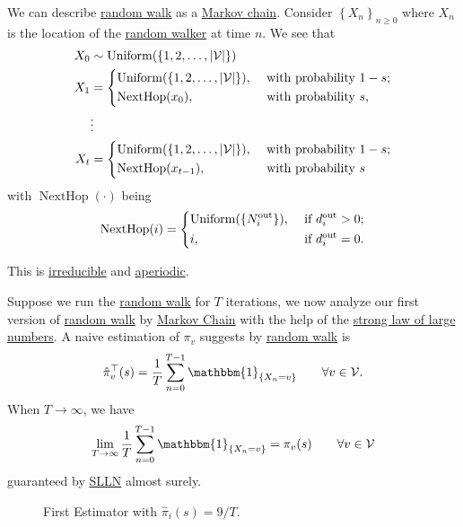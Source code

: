 We can describe \hyperref[algo:random-walk-algorithm]{random walk} as a \hyperref[def:Markov-chain]{Markov chain}. Consider \(\left\{ X_n \right\}_{n\geq 0}\) where \(X_n\) is the location of the \hyperref[def:random-walker]{random walker} at time \(n\). We see that
\[
	\begin{split}
		X_0 & \sim \operatorname{Uniform}(\{1, 2, \dots , \left\vert \mathcal{V} \right\vert\})                                 \\
		X_1 & =\begin{dcases}
			       \operatorname{Uniform}(\{1, 2, \dots , \left\vert \mathcal{V} \right\vert \}), & \text{ with probability }1 - s; \\
			       \operatorname{NextHop}(x_0),                                                   & \text{ with probability }s,     \\
		       \end{dcases} \\
		    & \vdots                                                                                                            \\
		X_t & =\begin{dcases}
			       \operatorname{Uniform}(\{1, 2, \dots , \left\vert \mathcal{V} \right\vert\}), & \text{ with probability }1 - s; \\
			       \operatorname{NextHop}(x_{t-1}),                                              & \text{ with probability }s      \\
		       \end{dcases}
	\end{split}
\]
with \(\operatorname{NextHop}(\cdot)\) being
\[
	\operatorname{NextHop}(i)=\begin{dcases}
		\operatorname{Uniform}(\{N^{\text{out}}_i\}), & \text{ if }d^{\text{out}}_i > 0; \\
		i,                                            & \text{ if }d^{\text{out}}_i = 0.
	\end{dcases}
\]
\begin{note}
	This is \hyperref[def:irreducible]{irreducible} and \hyperref[def:aperiodic]{aperiodic}.
\end{note}

Suppose we run the \hyperref[algo:random-walk-algorithm]{random walk} for \(T\) iterations, we now analyze our first version of \hyperref[algo:random-walk-algorithm]{random walk} by \hyperref[def:Markov-chain]{Markov Chain} with the help of the \hyperref[thm:SLLN]{strong law of large numbers}. A naive estimation of \(\pi_v \) suggests by \hyperref[algo:random-walk-algorithm]{random walk} is
\[
	\hat{\pi}^{\top}_{v}(s)
	= \frac{1}{T}\sum\limits_{n=0}^{T-1} \mathbbm{1}_{\{X_n = v\}}\qquad \forall v\in \mathcal{V}.
\]
When \(T\to \infty \), we have
\[
	\lim_{T\to \infty}\frac{1}{T} \sum\limits_{n=0}^{T-1} \mathbbm{1}_{\{X_n = v\}} = \pi_v(s) \qquad \forall v\in \mathcal{V}
\]
guaranteed by \hyperref[thm:SLLN]{SLLN} almost surely.
\begin{figure}[H]
	\centering
	\caption{First Estimator with \(\hat{\pi}_i(s) = 9/T\).}
	\label{fig:Monte-Carlo-Estimator-1}
\end{figure}

